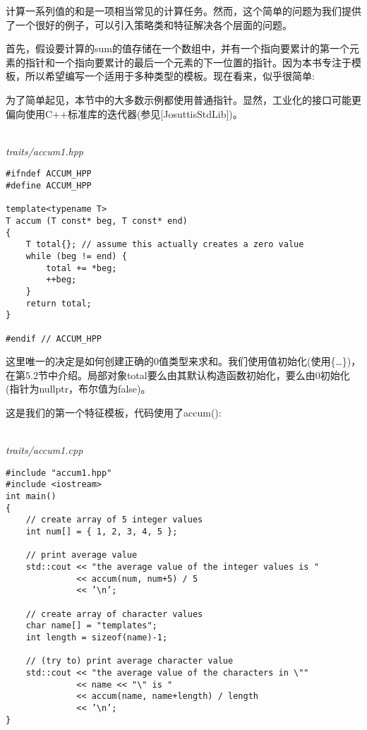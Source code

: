
计算一系列值的和是一项相当常见的计算任务。然而，这个简单的问题为我们提供了一个很好的例子，可以引入策略类和特征解决各个层面的问题。


首先，假设要计算的sum的值存储在一个数组中，并有一个指向要累计的第一个元素的指针和一个指向要累计的最后一个元素的下一位置的指针。因为本书专注于模板，所以希望编写一个适用于多种类型的模板。现在看来，似乎很简单:

\begin{tcolorbox}[colback=webgreen!5!white,colframe=webgreen!75!black]
\hspace*{0.75cm}为了简单起见，本节中的大多数示例都使用普通指针。显然，工业化的接口可能更偏向使用C++标准库的迭代器(参见[JosuttisStdLib])。
\end{tcolorbox}

\hspace*{\fill} \\ %
\noindent
\textit{traits/accum1.hpp}
\begin{lstlisting}[style=styleCXX]
#ifndef ACCUM_HPP
#define ACCUM_HPP

template<typename T>
T accum (T const* beg, T const* end)
{
	T total{}; // assume this actually creates a zero value
	while (beg != end) {
		total += *beg;
		++beg;
	}
	return total;
}

#endif // ACCUM_HPP
\end{lstlisting}

这里唯一的决定是如何创建正确的0值类型来求和。我们使用值初始化(使用\{…\})，在第5.2节中介绍。局部对象total要么由其默认构造函数初始化，要么由0初始化(指针为nullptr，布尔值为false)。

这是我们的第一个特征模板，代码使用了accum():

\hspace*{\fill} \\ %
\noindent
\textit{traits/accum1.cpp}
\begin{lstlisting}[style=styleCXX]
#include "accum1.hpp"
#include <iostream>
int main()
{
	// create array of 5 integer values
	int num[] = { 1, 2, 3, 4, 5 };
	
	// print average value
	std::cout << "the average value of the integer values is "
			  << accum(num, num+5) / 5
			  << ’\n’;
			  
	// create array of character values
	char name[] = "templates";
	int length = sizeof(name)-1;
	
	// (try to) print average character value
	std::cout << "the average value of the characters in \""
			  << name << "\" is "
			  << accum(name, name+length) / length
			  << ’\n’;
}
\end{lstlisting}

